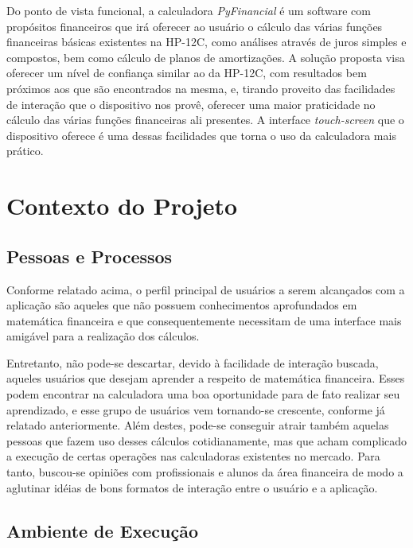 Do ponto de vista funcional, a calculadora \textit{PyFinancial} é um software com propósitos financeiros que irá oferecer ao usuário o cálculo das várias funções financeiras básicas existentes na HP-12C, como análises através de juros simples e compostos, bem como cálculo de planos de amortizações.  A solução proposta visa oferecer um nível de confiança similar ao da HP-12C, com resultados bem próximos aos que são encontrados na mesma, e, tirando proveito das facilidades de interação que o dispositivo nos provê, oferecer uma maior praticidade no cálculo das várias funções financeiras ali presentes. A interface \textit{touch-screen} que o dispositivo oferece é uma dessas facilidades que torna o uso da calculadora mais prático.


\section{Contexto do Projeto}

\subsection{Pessoas e Processos}

Conforme relatado acima, o perfil principal de usuários a serem alcançados com a aplicação são aqueles que não possuem conhecimentos aprofundados em matemática financeira e que consequentemente necessitam de uma interface mais amigável para a realização dos cálculos.

Entretanto, não pode-se descartar, devido à facilidade de interação buscada, aqueles usuários que desejam aprender a respeito de matemática financeira. Esses podem encontrar na calculadora uma boa oportunidade para de fato realizar seu aprendizado, e esse grupo de usuários vem tornando-se crescente, conforme já relatado anteriormente. Além destes, pode-se conseguir atrair também aquelas pessoas que fazem uso desses cálculos cotidianamente, mas que acham complicado a execução de certas operações nas calculadoras existentes no mercado. Para tanto, buscou-se opiniões com profissionais e alunos da área financeira de modo a aglutinar idéias de bons formatos de interação entre o usuário e a aplicação.


\subsection{Ambiente de Execução}

